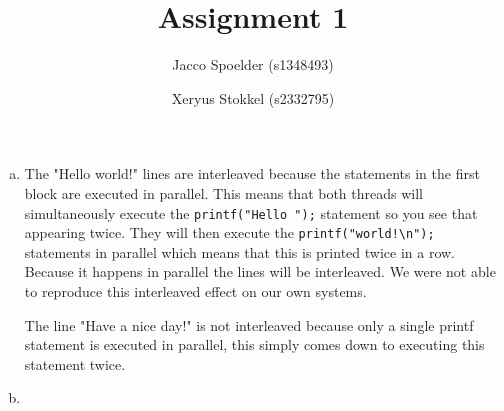 \documentclass[a4paper]{article}
\title{Assignment 1}
\author{Jacco Spoelder (s1348493) \and Xeryus Stokkel (s2332795)}
\begin{document}
\maketitle

\begin{enumerate}[(a)]
	\item The "Hello world!" lines are interleaved because the statements in the first block are executed in parallel. This means that both threads will simultaneously execute the \texttt{printf("Hello ");} statement so you see that appearing twice. They will then execute the \texttt{printf("world!\textbackslash n");} statements in parallel which means that this is printed twice in a row. Because it happens in parallel the lines will be interleaved. We were not able to reproduce this interleaved effect on our own systems.
	
	The line "Have a nice day!" is not interleaved because only a single printf statement is executed in parallel, this simply comes down to executing this statement twice.
	\item 
\end{enumerate}
\end{document}
